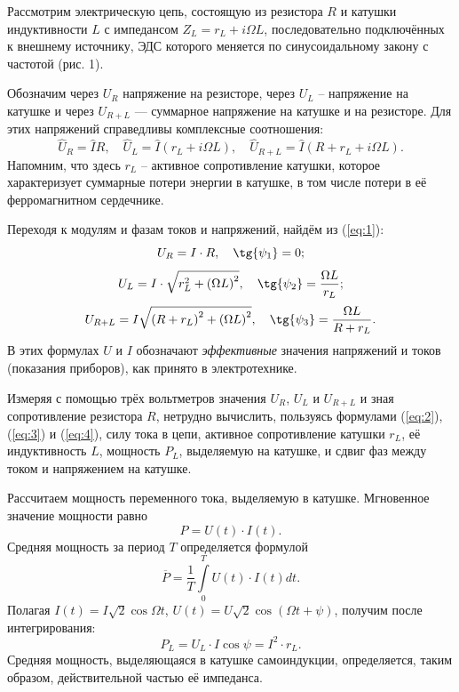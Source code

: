 \documentclass[12pt,a4paper]{article}
\begin{document}
Рассмотрим электрическую цепь, состоящую из резистора $ R $ и катушки индуктивности $ L $ с импедансом $ Z_L = r_L + i \Omega L $, последовательно подключённых к внешнему источнику, ЭДС которого меняется по синусоидальному закону с частотой (рис. 1).

Обозначим через $ U_R $ напряжение на резисторе, через $ U_L $ -- напряжение на катушке и через $ U_{R+L} $ — суммарное напряжение на катушке и на резисторе. Для этих напряжений справедливы комплексные соотношения:
\begin{equation}\label{eq:1}
{\widehat U_R} = \widehat IR, \quad {\widehat U_L} = \widehat I\left( {{r_L} + i\Omega L} \right), \quad {\widehat U_{R + L}} = \widehat I\left( {R + {r_L} + i\Omega L} \right).
\end{equation}
Напомним, что здесь $ r_L $ -- активное сопротивление катушки, которое характеризует суммарные потери энергии в катушке, в том числе потери в её ферромагнитном сердечнике.

Переходя к модулям и фазам токов и напряжений, найдём из (\ref{eq:1}):
\begin{equation}\label{eq:2}
{U_R} = I \cdot R, \quad \tg{\psi _1} = 0;
\end{equation}
\begin{equation}\label{eq:3}
{U_L} = I \cdot \sqrt {r_L^2 + {{\left( {\Omega L} \right)}^2}}, \quad \tg{\psi _2} = \frac{{\Omega L}}{{{r_L}}};
\end{equation}
\begin{equation}\label{eq:4}
{U_{R + L}} = I\sqrt {{{\left( {R + {r_L}} \right)}^2} + {{\left( {\Omega L} \right)}^2}}, \quad \tg{\psi _3} = \frac{{\Omega L}}{{R + {r_L}}}.
\end{equation}
В этих формулах $ U $ и $ I $ обозначают \textit{эффективные} значения напряжений и токов (показания приборов), как принято в электротехнике.

Измеряя с помощью трёх вольтметров значения $ U_R $, $ U_L $ и $ U_{R+L} $ и зная сопротивление резистора $ R $, нетрудно вычислить, пользуясь формулами (\ref{eq:2}), (\ref{eq:3}) и (\ref{eq:4}), силу тока в цепи, активное сопротивление катушки $ r_L $, её индуктивность $ L $, мощность $ P_L $, выделяемую на катушке, и сдвиг фаз между током и напряжением на катушке.

Рассчитаем мощность переменного тока, выделяемую в катушке. Мгновенное значение мощности равно
\begin{equation*}
P = U\left( t \right) \cdot I\left( t \right).
\end{equation*}
Средняя мощность за период $ T $ определяется формулой
\begin{equation*}
\overline P  = \frac{1}{T}\int\limits_0^T {U\left( t \right) \cdot I\left( t \right)dt}.
\end{equation*}
Полагая $ \displaystyle I\left( t \right) = I\sqrt 2 \cos \Omega t $, $ U\left( t \right) = U\sqrt 2 \cos \left( {\Omega t + \psi } \right) $, получим после интегрирования:
\begin{equation}\label{eq:5}
{P_L} = {U_L} \cdot I\cos \psi  = {I^2} \cdot {r_L}.
\end{equation}
Средняя мощность, выделяющаяся в катушке самоиндукции, определяется, таким образом, действительной частью её импеданса.
\end{document}
